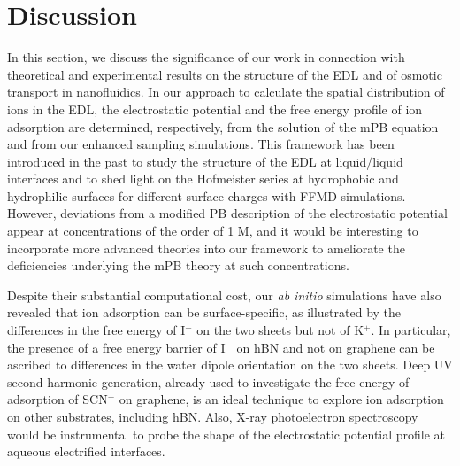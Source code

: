 \documentclass[journal=ancac3,manuscript=article,layout=twocolumn]{achemso}
\begin{document}
\section{Discussion}
In this section, we
discuss the significance of our
work in connection with theoretical and experimental results
on the structure of the EDL and of osmotic transport in nanofluidics.
%
In our approach to calculate the
spatial distribution of ions in the EDL,
the electrostatic potential and the
free energy profile of ion adsorption are
determined, respectively, from the
solution of the mPB equation and from our
enhanced sampling simulations.
This framework has been introduced in
the past to study the structure of the EDL
at liquid/liquid interfaces\cite{luo2006ion} and to
shed light on the Hofmeister
series at hydrophobic and hydrophilic
surfaces for different surface
charges with FFMD simulations\cite{schwierz2010reversed}.
However, deviations from a modified PB
description of the electrostatic
potential appear at concentrations of the order of 1 M\cite{gonella2021water},
and it would be interesting
to incorporate
more advanced theories into our framework
to ameliorate the deficiencies
underlying the mPB theory
at such concentrations\cite{duignan2021toward,hartel2015fundamental,netz2001electrostatistics,kardar1999friction}.

Despite their substantial computational cost,
our \textit{ab initio} simulations
have also revealed that ion adsorption
can be surface-specific, as illustrated
by the differences in the free
energy of I$^-$ on the two sheets but not
of K$^+$. In particular, the presence of a
free energy barrier of I$^-$ on
hBN and not on graphene can be ascribed to
 differences in the water dipole orientation
 on the two sheets.
Deep UV second harmonic generation,
already used to investigate the free energy
of adsorption of SCN$^-$ on
graphene\cite{mccaffrey2017mechanism},
is an ideal technique to explore
ion adsorption on other substrates, including hBN.
Also, X-ray photoelectron spectroscopy
would be instrumental to probe the shape of the electrostatic potential profile
at aqueous electrified interfaces\cite{favaro2016unravelling}.
\end{document}
